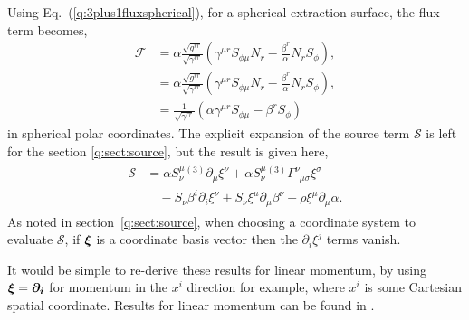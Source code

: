 Using Eq.~(\ref{q:3plus1fluxspherical}), for a spherical extraction surface, the flux term becomes,
\begin{align}
 \mathcal{F} &= \alpha\frac{\sqrt{g^{rr}}}{\sqrt{\gamma^{rr}}} (\gamma^{\mu r} S_{\phi\mu} N_r -\frac{\beta^r}{\alpha}N_r S_\phi), \\
 &= \alpha\frac{\sqrt{g^{rr}}}{\sqrt{\gamma^{rr}}} (\gamma^{\mu r} S_{\phi\mu} N_r -\frac{\beta^r}{\alpha}N_r S_\phi), \\
  \label{q:final_flux} &= \frac{1}{\sqrt{\gamma^{rr}}}\left(\alpha \gamma^{\mu r}S_{\phi\mu} -\beta^r S_\phi\right)
\end{align}
in spherical polar coordinates. The explicit expansion of the source term $\mathcal{S}$ is left for the section \ref{q:sect:source}, but the result is given here,
\begin{align}\label{q:s_explicit_angmom}
\begin{split}\mathcal{S} &= \alpha S^\mu_{\nu}{}^{(3)}\partial_\mu \xi^\nu + \alpha S^\mu_{\nu} {}^{(3)}\Gamma^\nu_{\,\,\,\mu \sigma} \xi^\sigma \\&\quad- S_\nu \beta^i \partial_i \xi^\nu  + S_\nu \xi^\mu \partial_\mu \beta^\nu - \rho \xi^\mu \partial_\mu \alpha.
\end{split}
\end{align}
As noted in section~\ref{q:sect:source}, when choosing a coordinate system to evaluate $\mathcal{S}$, if $\boldsymbol{\xi}$ is a coordinate basis vector then the $\partial_i \xi^j$ terms vanish.

It would be simple to re-derive these results for linear momentum, by using $\boldsymbol{\xi} = \boldsymbol{\partial_i}$ for momentum in the $x^i$ direction for example, where $x^i$ is some Cartesian spatial coordinate. Results for linear momentum can be found in \cite{Clough_2021}.





